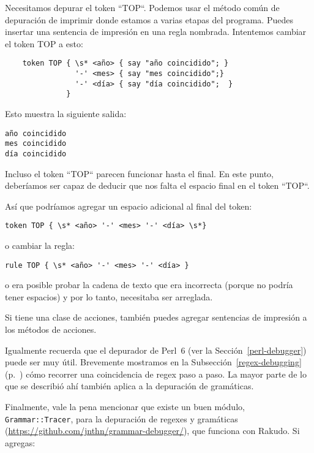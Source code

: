 Necesitamos depurar el token ``TOP``. Podemos usar el método común
de depuración de imprimir donde estamos a varias etapas del
programa. Puedes insertar una sentencia de impresión en
una regla nombrada. Intentemos cambiar el token TOP a esto:

\begin{verbatim}
    token TOP { \s* <año> { say "año coincidido"; }
                '-' <mes> { say "mes coincidido";}
                '-' <día> { say "día coincidido";  }
              }
\end{verbatim}

Esto muestra la siguiente salida:

\begin{verbatim}
año coincidido
mes coincidido
día coincidido
\end{verbatim}


Incluso el token ``TOP`` parecen funcionar hasta el final. 
En este punto, deberíamos ser capaz de deducir que nos falta
el espacio final en el token ``TOP``.

Así que podríamos agregar un espacio adicional al final del
token:

\begin{verbatim}
token TOP { \s* <año> '-' <mes> '-' <día> \s*}
\end{verbatim}

o cambiar la regla:

\begin{verbatim}
rule TOP { \s* <año> '-' <mes> '-' <día> }
\end{verbatim}

o era posible probar la cadena de texto que era incorrecta (porque
no podría tener espacios) y por lo tanto, necesitaba ser arreglada.

Si tiene una clase de acciones, también puedes agregar sentencias de
impresión a los métodos de acciones.

Igualmente recuerda que el depurador de Perl~6 (ver 
la Sección~\ref{perl-debugger}) puede ser muy útil. 
Brevemente mostramos en la Subsección~\ref{regex-debugging} 
(p.~\pageref{regex-debugging}) cómo recorrer una coincidencia
de regex paso a paso. La mayor parte de lo que se describió 
ahí también aplica a la depuración de gramáticas.

Finalmente, vale la pena mencionar que existe un buen módulo, \verb|Grammar::Tracer|, 
para la depuración de regexes y gramáticas (\url{https://github.com/jnthn/grammar-debugger/}), 
que funciona con Rakudo. Si agregas:

